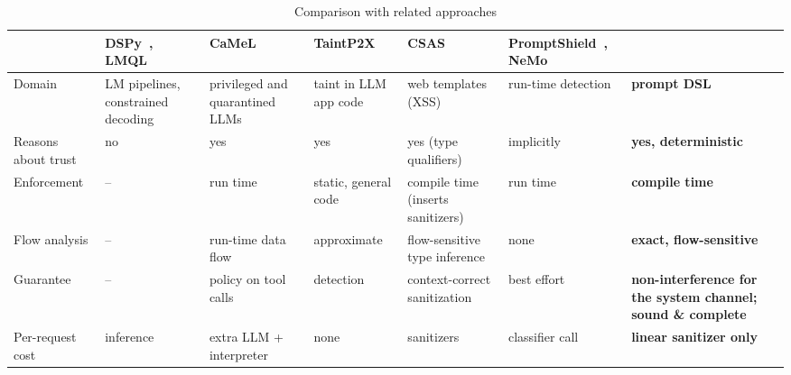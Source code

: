 \documentclass[conference]{IEEEtran}
\begin{document}
\begin{table}[t]
\caption{Comparison with related approaches}
\label{tab:related}
\centering\footnotesize
\setlength{\tabcolsep}{3pt}
\begin{tabular}{@{}p{2.0cm}p{2.2cm}p{2.2cm}p{2.2cm}p{2.2cm}p{2.4cm}p{2.4cm}@{}}
\toprule
 & DSPy~\cite{khattab2024dspy}, LMQL~\cite{beurer2023lmql} & CaMeL~\cite{debenedetti2025camel} & TaintP2X~\cite{he2026taintp2x} & CSAS~\cite{samuel2011csas} & PromptShield~\cite{jacob2024promptshield}, NeMo~\cite{rebedea2023nemo} & \textbf{\TL{}} \\
\midrule
Domain & LM pipelines, constrained decoding & privileged and quarantined LLMs & taint in LLM app code & web templates (XSS) & run-time detection & \textbf{prompt DSL} \\
Reasons about trust & no & yes & yes & yes (type qualifiers) & implicitly & \textbf{yes, deterministic} \\
Enforcement & -- & run time & static, general code & compile time (inserts sanitizers) & run time & \textbf{compile time} \\
Flow analysis & -- & run-time data flow & approximate & flow-sensitive type inference & none & \textbf{exact, flow-sensitive} \\
Guarantee & -- & policy on tool calls & detection & context-correct sanitization & best effort & \textbf{non-interference for the system channel; sound \& complete} \\
Per-request cost & inference & extra LLM + interpreter & none & sanitizers & classifier call & \textbf{linear sanitizer only} \\
\bottomrule
\end{tabular}
\end{table}
\end{document}

